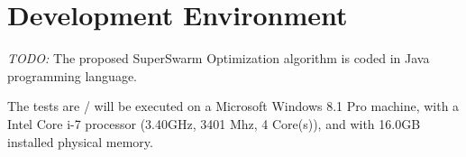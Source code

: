 \section{Development Environment}

\emph{\color{blue}TODO:} 
The proposed SuperSwarm Optimization algorithm is coded in Java programming language.  





The tests are / will be executed on a Microsoft Windows 8.1 Pro machine, with a Intel Core i-7 processor (3.40GHz, 3401 Mhz, 4 Core(s)), and with 16.0GB installed physical memory.



